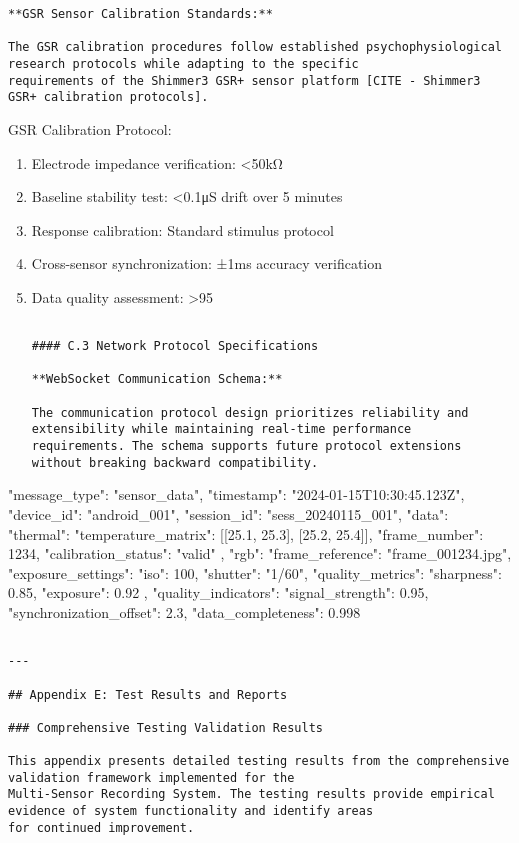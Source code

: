 \documentclass[12pt,a4paper]{article}
\begin{document}
{{\begin{itemize}
\begin{verbatim}
**GSR Sensor Calibration Standards:**

The GSR calibration procedures follow established psychophysiological research protocols while adapting to the specific
requirements of the Shimmer3 GSR+ sensor platform [CITE - Shimmer3 GSR+ calibration protocols].

\end{verbatim}
\end{itemize}
GSR Calibration Protocol:
\begin{enumerate}
\item Electrode impedance verification: <50kΩ
\item Baseline stability test: <0.1μS drift over 5 minutes
\item Response calibration: Standard stimulus protocol
\item Cross-sensor synchronization: ±1ms accuracy verification
\item Data quality assessment: >95%
\begin{verbatim}

#### C.3 Network Protocol Specifications

**WebSocket Communication Schema:**

The communication protocol design prioritizes reliability and extensibility while maintaining real-time performance
requirements. The schema supports future protocol extensions without breaking backward compatibility.

\end{verbatim}
\end{enumerate}
{
  "message\_type": "sensor\_data",
  "timestamp": "2024-01-15T10:30:45.123Z",
  "device\_id": "android\_001",
  "session\_id": "sess\_20240115\_001",
  "data": {
    "thermal": {
      "temperature\_matrix": [[25.1, 25.3], [25.2, 25.4]],
      "frame\_number": 1234,
      "calibration\_status": "valid"
    },
    "rgb": {
      "frame\_reference": "frame\_001234.jpg",
      "exposure\_settings": {"iso": 100, "shutter": "1/60"},
      "quality\_metrics": {"sharpness": 0.85, "exposure": 0.92}
    }
  },
  "quality\_indicators": {
    "signal\_strength": 0.95,
    "synchronization\_offset": 2.3,
    "data\_completeness": 0.998
  }
}
\begin{verbatim}

---

## Appendix E: Test Results and Reports

### Comprehensive Testing Validation Results

This appendix presents detailed testing results from the comprehensive validation framework implemented for the
Multi-Sensor Recording System. The testing results provide empirical evidence of system functionality and identify areas
for continued improvement.


\end{verbatim}}}
\end{document}
